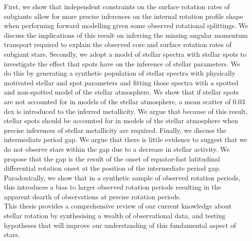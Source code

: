 {First, we show that independent constraints on the surface rotation rates of subgiants allow for more precise inferences on the internal rotation profile shape when performing forward modelling given some observed rotational splittings. We discuss the implications of this result on inferring the missing angular momentum transport required to explain the observed core and surface rotation rates of subgiant stars.
Secondly, we adopt a model of stellar spectra with stellar spots to investigate the effect that spots have on the inference of stellar parameters. We do this by generating a synthetic population of stellar spectra with physically motivated stellar and spot parameters and fitting those spectra with a spotted and non-spotted model of the stellar atmosphere. We show that if stellar spots are not accounted for in models of the stellar atmosphere, a mean scatter of 0.03 dex is introduced to the inferred metallicity. 
We argue that because of this result, stellar spots should be accounted for in models of the stellar atmosphere when precise inferences of stellar metallicity are required.
Finally, we discuss the intermediate period gap. We argue that there is little evidence to suggest that we do not observe stars within the gap due to a decrease in stellar activity. 
We propose that the gap is the result of the onset of equator-fast latitudinal differential rotation onset at the position of the intermediate period gap. Paradoxically, we show that in a synthetic sample of observed rotation periods, this introduces a bias to larger observed rotation periods resulting in the apparent dearth of observations at precise rotation periods.\\

This thesis provides a comprehensive review of our current knowledge about stellar rotation by synthesising a wealth of observational data, and testing hypotheses that will improve our understanding of this fundamental aspect of stars.
}


